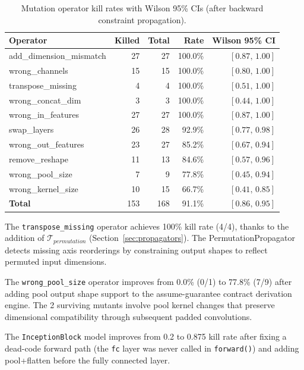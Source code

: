\documentclass[11pt]{article}
\begin{document}
\begin{table}[h]
\centering
\caption{Mutation operator kill rates with Wilson 95\% CIs
  (after backward constraint propagation).}
\label{tab:mutation-operators}
\small
\begin{tabular}{@{}lrrrr@{}}
\toprule
\textbf{Operator} & \textbf{Killed} & \textbf{Total} & \textbf{Rate} &
  \textbf{Wilson 95\% CI} \\
\midrule
add\_dimension\_mismatch  & 27 & 27 & 100.0\% & $[0.87,\, 1.00]$ \\
wrong\_channels           & 15 & 15 & 100.0\% & $[0.80,\, 1.00]$ \\
transpose\_missing        &  4 &  4 & 100.0\% & $[0.51,\, 1.00]$ \\
wrong\_concat\_dim        &  3 &  3 & 100.0\% & $[0.44,\, 1.00]$ \\
wrong\_in\_features       & 27 & 27 & 100.0\% & $[0.87,\, 1.00]$ \\
swap\_layers              & 26 & 28 &  92.9\% & $[0.77,\, 0.98]$ \\
wrong\_out\_features      & 23 & 27 &  85.2\% & $[0.67,\, 0.94]$ \\
remove\_reshape           & 11 & 13 &  84.6\% & $[0.57,\, 0.96]$ \\
wrong\_pool\_size         &  7 &  9 &  77.8\% & $[0.45,\, 0.94]$ \\
wrong\_kernel\_size       & 10 & 15 &  66.7\% & $[0.41,\, 0.85]$ \\
\midrule
\textbf{Total}            & 153 & 168 & 91.1\% & $[0.86,\, 0.95]$ \\
\bottomrule
\end{tabular}
\end{table}

The \texttt{transpose\_missing} operator achieves 100\% kill rate
(4/4), thanks to the addition
of $\mathcal{T}_{\mathit{permutation}}$ (Section~\ref{sec:propagators}).
The PermutationPropagator detects missing axis reorderings by
constraining output shapes to reflect permuted input dimensions.

The \texttt{wrong\_pool\_size} operator improves from 0.0\% (0/1) to
77.8\% (7/9) after adding pool output shape support to the
assume-guarantee contract derivation engine.  The 2 surviving mutants
involve pool kernel changes that preserve dimensional compatibility
through subsequent padded convolutions.

The \texttt{InceptionBlock} model improves from 0.2 to 0.875 kill rate
after fixing a dead-code forward path (the \texttt{fc} layer was
never called in \texttt{forward()}) and adding pool+flatten before
the fully connected layer.
\end{document}
